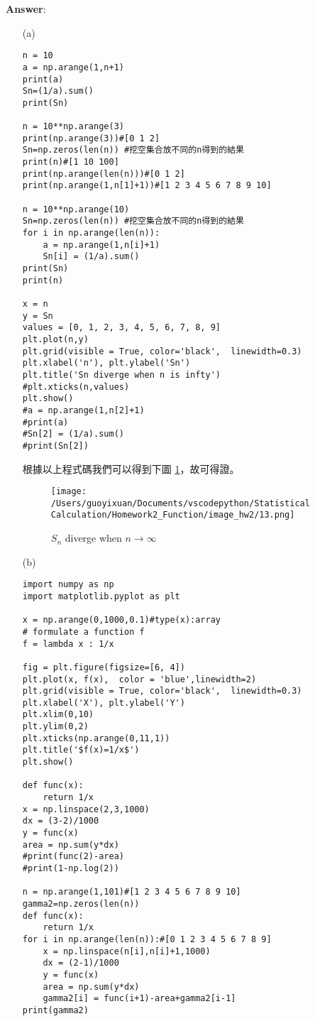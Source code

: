 {\bf Answer}:

\begin{itemize}
\item[(a)]
\bigskip
\begin{lstlisting}
n = 10
a = np.arange(1,n+1)
print(a)
Sn=(1/a).sum()
print(Sn)

n = 10**np.arange(3)
print(np.arange(3))#[0 1 2]
Sn=np.zeros(len(n)) #挖空集合放不同的n得到的結果
print(n)#[1 10 100]
print(np.arange(len(n)))#[0 1 2]
print(np.arange(1,n[1]+1))#[1 2 3 4 5 6 7 8 9 10]

n = 10**np.arange(10)
Sn=np.zeros(len(n)) #挖空集合放不同的n得到的結果
for i in np.arange(len(n)):
    a = np.arange(1,n[i]+1)
    Sn[i] = (1/a).sum()
print(Sn)
print(n)

x = n
y = Sn
values = [0, 1, 2, 3, 4, 5, 6, 7, 8, 9]
plt.plot(n,y)
plt.grid(visible = True, color='black',  linewidth=0.3)
plt.xlabel('n'), plt.ylabel('Sn')
plt.title('Sn diverge when n is infty')
#plt.xticks(n,values)
plt.show()
#a = np.arange(1,n[2]+1)
#print(a)
#Sn[2] = (1/a).sum()
#print(Sn[2])
\end{lstlisting}

根據以上程式碼我們可以得到下圖 \ref{fig:infty}，故可得證。
\begin{figure}[H]
    \centering
        \texttt{[image: /Users/guoyixuan/Documents/vscodepython/Statistical Calculation/Homework2\_Function/image\_hw2/13.png]}
    \caption{$S_n$ diverge when $n \to \infty$}
    \label{fig:infty}
\end{figure}

\item[(b)]
\bigskip
\begin{lstlisting}
import numpy as np
import matplotlib.pyplot as plt

x = np.arange(0,1000,0.1)#type(x):array
# formulate a function f
f = lambda x : 1/x
 
fig = plt.figure(figsize=[6, 4])
plt.plot(x, f(x),  color = 'blue',linewidth=2)
plt.grid(visible = True, color='black',  linewidth=0.3)
plt.xlabel('X'), plt.ylabel('Y')
plt.xlim(0,10)
plt.ylim(0,2)
plt.xticks(np.arange(0,11,1))
plt.title('$f(x)=1/x$')
plt.show()

def func(x):
    return 1/x
x = np.linspace(2,3,1000)
dx = (3-2)/1000
y = func(x)
area = np.sum(y*dx)
#print(func(2)-area)
#print(1-np.log(2))

n = np.arange(1,101)#[1 2 3 4 5 6 7 8 9 10]
gamma2=np.zeros(len(n))
def func(x):
    return 1/x
for i in np.arange(len(n)):#[0 1 2 3 4 5 6 7 8 9]
    x = np.linspace(n[i],n[i]+1,1000)
    dx = (2-1)/1000
    y = func(x)
    area = np.sum(y*dx)
    gamma2[i] = func(i+1)-area+gamma2[i-1]
print(gamma2)


\end{lstlisting}
\end{itemize}
